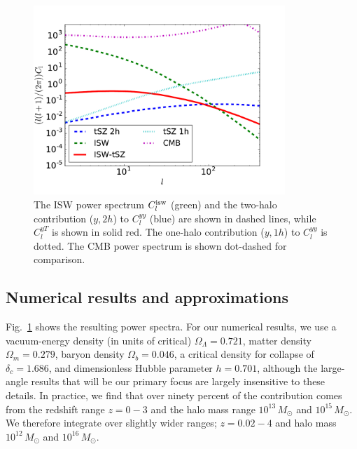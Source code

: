 \documentclass[aps,twocolumn,floats,prd,nofootinbib,10pt,floatfix]{revtex4-1}
\begin{document}
\begin{figure}[h]
\includegraphics[width=9.5cm, height = 7 cm]{ISWtsz.pdf}
    \caption{The ISW power spectrum $C_l^{\rm isw}$ (green) and
    the two-halo contribution ($y,2h$) to $C_l^{yy}$ (blue) are
    shown in dashed
    lines, while $C_l^{yT}$ is shown in solid
    red. The one-halo contribution ($y, 1h$) to $C_l^{yy}$ is
    dotted.  The CMB power spectrum is shown dot-dashed for
    comparison.} 
\label{fig:power}
\end{figure}

\subsection{Numerical results and approximations}

Fig.~\ref{fig:power} shows the resulting power spectra.  
For our numerical results, we use a vacuum-energy density (in
units of critical) $\Omega_{\Lambda} = 0.721$, matter density
$\Omega_m = 0.279$, baryon density $\Omega_b = 0.046$, a
critical density for collapse of $\delta_c = 1.686$, and
dimensionless Hubble parameter $h= 0.701$, although the
large-angle results that will be our primary focus are largely
insensitive to these details. In practice, we find that over ninety percent 
of the contribution comes from the redshift range $z = 0-3$ and the halo mass range 
$10^{13}\,M_\odot$ and $10^{15}\,M_\odot$. 
We therefore integrate over slightly wider ranges; $z = 0.02 - 4$  
and halo mass $10^{12}\,M_\odot$ and $10^{16}\,M_\odot$.
\end{document}
